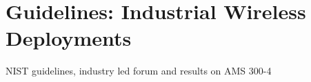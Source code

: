 \chapter{Guidelines: Industrial Wireless Deployments}

NIST guidelines, industry led forum and results on AMS 300-4
